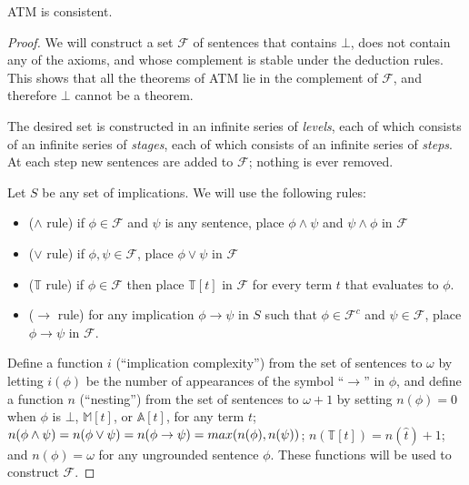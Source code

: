 \documentclass[10pt,a4paper]{amsart}
\begin{document}
\begin{theorem}\label{lpcons}
  ATM is consistent.
\end{theorem}

\begin{proof}
  We will construct a set $\mathcal{F}$ of sentences that contains $\bot$, does not contain any of the axioms, and
  whose complement is stable under the deduction rules. This shows that all the theorems of ATM lie
  in the complement of $\mathcal{F}$, and therefore $\bot$ cannot be a theorem.

  The desired set is constructed in an infinite series of {\it levels}, each of
  which consists of an infinite series of {\it stages}, each of which consists of an infinite series of {\it steps}.
  At each step new sentences are added to $\mathcal{F}$; nothing is ever removed.

  Let $S$ be any set of implications. We will use the following rules:

  \begin{itemize}
  \item ($\wedge$ rule) if $\phi \in \mathcal{F}$ and $\psi$ is any sentence, place $\phi \wedge \psi$
    and $\psi \wedge \phi$ in $\mathcal{F}$

  \item ($\vee$ rule) if $\phi, \psi \in \mathcal{F}$, place $\phi \vee \psi$ in $\mathcal{F}$

  \item ($\mathbb{T}$ rule) if $\phi \in \mathcal{F}$ then place $\mathbb{T}[t]$ in $\mathcal{F}$ for every
    term $t$ that evaluates to $\phi$.

  \item ($\to$ rule) for any implication $\phi \to \psi$ in $S$ such that  $\phi \in \mathcal{F}^c$ and
    $\psi \in \mathcal{F}$, place $\phi \to \psi$ in $\mathcal{F}$.
  \end{itemize}

  Define a function $i$ (``implication complexity'') from the set of sentences to $\omega$ by letting $i(\phi)$ be the
  number of appearances of the symbol ``$\to$'' in $\phi$, and define a function $n$ (``nesting'') from the set of
  sentences to $\omega + 1$ by setting $n(\phi) = 0$ when $\phi$ is $\bot$, $\mathbb{M}[t]$, or $\mathbb{A}[t]$, for any
  term $t$; $n(\phi \wedge \psi) = n(\phi \vee \psi) = n(\phi \to \psi) = {\rm max}(n(\phi), n(\psi))$;
  $n(\mathbb{T}[t]) = n(\hat{t}) + 1$; and $n(\phi) = \omega$ for any ungrounded sentence $\phi$.
  These functions will be used to construct $\mathcal{F}$.


\end{proof}
\end{document}
